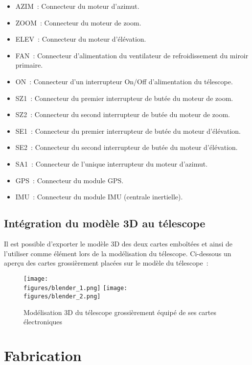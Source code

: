 \begin{itemize}[label=$\bullet$]
	\item AZIM~: Connecteur du moteur d'azimut.
	\item ZOOM~: Connecteur du moteur de zoom.
	\item ELEV~: Connecteur du moteur d'élévation.
	\item FAN~: Connecteur d'alimentation du ventilateur de refroidissement du miroir primaire.
	\item ON~: Connecteur d'un interrupteur On/Off d'alimentation du télescope.
	\item SZ1~: Connecteur du premier interrupteur de butée du moteur de zoom.
	\item SZ2~: Connecteur du second interrupteur de butée du moteur de zoom.
	\item SE1~: Connecteur du premier interrupteur de butée du moteur d'élévation.
	\item SE2~: Connecteur du second interrupteur de butée du moteur d'élévation.
	\item SA1~: Connecteur de l'unique interrupteur du moteur d'azimut.
	\item GPS~: Connecteur du module GPS.
	\item IMU~: Connecteur du module IMU (centrale inertielle).
	\end{itemize}

\subsection{Intégration du modèle 3D au télescope}

Il est possible d'exporter le modèle 3D des deux cartes emboîtées et ainsi de l'utiliser comme élément lors de la modélisation du télescope. Ci-dessous un aperçu des cartes grossièrement placées sur le modèle du télescope~:

\begin{figure}[H]
    \centering
    \texttt{[image: \\figures/blender\_1.png]}
    \texttt{[image: \\figures/blender\_2.png]}
    \decoRule
    \caption[
    Modélisation 3D du télescope grossièrement équipé de ses cartes électroniques]{
    Modélisation 3D du télescope grossièrement équipé de ses cartes électroniques}
    \label{fig:Modélisation 3D du télescope grossièrement équipé de ses cartes électroniques}
    \end{figure}

\section{Fabrication}%

